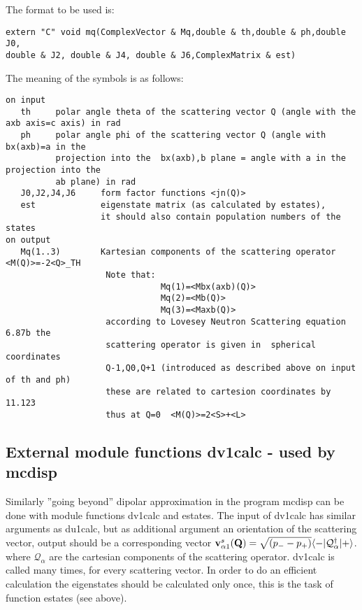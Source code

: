 The format to be used is:
{\footnotesize
\begin{verbatim}
extern "C" void mq(ComplexVector & Mq,double & th,double & ph,double J0,
double & J2, double & J4, double & J6,ComplexMatrix & est)
\end{verbatim}

The meaning of the symbols is as follows:

\begin{verbatim}
on input
   th     polar angle theta of the scattering vector Q (angle with the axb axis=c axis) in rad
   ph     polar angle phi of the scattering vector Q (angle with bx(axb)=a in the 
          projection into the  bx(axb),b plane = angle with a in the projection into the 
		  ab plane) in rad
   J0,J2,J4,J6     form factor functions <jn(Q)>   
   est             eigenstate matrix (as calculated by estates),
                   it should also contain population numbers of the states
on output
   Mq(1..3)        Kartesian components of the scattering operator <M(Q)>=-2<Q>_TH
                    Note that: 
                               Mq(1)=<Mbx(axb)(Q)>
                               Mq(2)=<Mb(Q)>
                               Mq(3)=<Maxb(Q)>
                    according to Lovesey Neutron Scattering equation 6.87b the 
                    scattering operator is given in  spherical coordinates 
					Q-1,Q0,Q+1 (introduced as described above on input of th and ph)
					these are related to cartesion coordinates by 11.123
				    thus at Q=0  <M(Q)>=2<S>+<L>

\end{verbatim}
}

\subsection{External module functions {\prg dv1calc} - used by {\prg mcdisp}  }

Similarly  ''going beyond''  dipolar approximation in the program {\prg mcdisp}
can be done with  module functions {\prg dv1calc} and {\prg estates}. 
The input of {\prg dv1calc} 
has similar arguments as
{\prg du1calc}, but as additional argument an orientation
of the scattering vector,
output should be a corresponding vector
 ${\mathbf v^s_{\alpha1}}(\mathbf Q)=\sqrt{(p_--p_+)}\langle -|\mathcal Q^{\dag}_{\alpha}|+\rangle$.
where $\mathcal Q_{\alpha}$ are the cartesian components of the scattering operator.
 {\prg dv1calc} is called many times, for
 every scattering vector. In order to
 do an efficient calculation the eigenstates should be calculated only
 once, this is the task of function {\prg estates} (see above).


